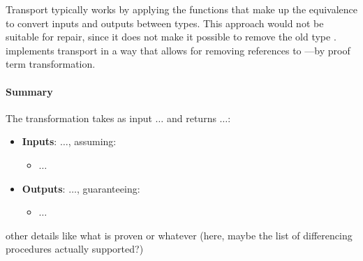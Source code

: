 Transport typically works by applying the functions that make up the equivalence to convert
inputs and outputs between types.
This approach would not be suitable for repair, since it does not make it possible to remove the old type \Aa.
\toolnamec implements transport in a way that allows for removing references to \Aa---by proof term transformation.

\paragraph{Summary}

The transformation takes as input $\ldots$ and returns $\ldots$:

\begin{itemize}
\item \textbf{Inputs}: $\ldots$, assuming:
\begin{itemize}
\item $\ldots$
\end{itemize}
\item \textbf{Outputs}: $\ldots$, guaranteeing:
\begin{itemize}
\item $\ldots$
\end{itemize}
\end{itemize}
other details like what is proven or whatever (here, maybe the list of differencing procedures actually supported?)



